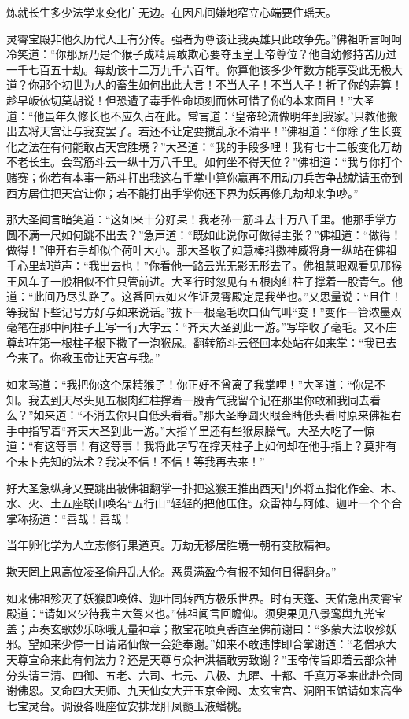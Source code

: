 \documentclass[12pt,UTF8]{ctexbook}
\begin{document}
{炼就长生多少法学来变化广无边。在因凡间嫌地窄立心端要住瑶天。

灵霄宝殿非他久历代人王有分传。强者为尊该让我英雄只此敢争先。”佛祖听言呵呵冷笑道：“你那厮乃是个猴子成精焉敢欺心要夺玉皇上帝尊位？他自幼修持苦历过一千七百五十劫。每劫该十二万九千六百年。你算他该多少年数方能享受此无极大道？你那个初世为人的畜生如何出此大言！不当人子！不当人子！折了你的寿算！趁早皈依切莫胡说！但恐遭了毒手性命顷刻而休可惜了你的本来面目！”大圣道：“他虽年久修长也不应久占在此。常言道：‘皇帝轮流做明年到我家。’只教他搬出去将天宫让与我变罢了。若还不让定要搅乱永不清平！”佛祖道：“你除了生长变化之法在有何能敢占天宫胜境？”大圣道：“我的手段多哩！我有七十二般变化万劫不老长生。会驾筋斗云一纵十万八千里。如何坐不得天位？”佛祖道：“我与你打个赌赛；你若有本事一筋斗打出我这右手掌中算你赢再不用动刀兵苦争战就请玉帝到西方居住把天宫让你；若不能打出手掌你还下界为妖再修几劫却来争吵。”

那大圣闻言暗笑道：“这如来十分好呆！我老孙一筋斗去十万八千里。他那手掌方圆不满一尺如何跳不出去？”急声道：“既如此说你可做得主张？”佛祖道：“做得！做得！”伸开右手却似个荷叶大小。那大圣收了如意棒抖擞神威将身一纵站在佛祖手心里却道声：“我出去也！”你看他一路云光无影无形去了。佛祖慧眼观看见那猴王风车子一般相似不住只管前进。大圣行时忽见有五根肉红柱子撑着一股青气。他道：“此间乃尽头路了。这番回去如来作证灵霄殿定是我坐也。”又思量说：“且住！等我留下些记号方好与如来说话。”拔下一根毫毛吹口仙气叫“变！”变作一管浓墨双毫笔在那中间柱子上写一行大字云：“齐天大圣到此一游。”写毕收了毫毛。又不庄尊却在第一根柱子根下撒了一泡猴尿。翻转筋斗云径回本处站在如来掌：“我已去今来了。你教玉帝让天宫与我。”

如来骂道：“我把你这个尿精猴子！你正好不曾离了我掌哩！”大圣道：“你是不知。我去到天尽头见五根肉红柱撑着一股青气我留个记在那里你敢和我同去看么？”如来道：“不消去你只自低头看看。”那大圣睁圆火眼金睛低头看时原来佛祖右手中指写着“齐天大圣到此一游。”大指丫里还有些猴尿臊气。大圣大吃了一惊道：“有这等事！有这等事！我将此字写在撑天柱子上如何却在他手指上？莫非有个未卜先知的法术？我决不信！不信！等我再去来！”

好大圣急纵身又要跳出被佛祖翻掌一扑把这猴王推出西天门外将五指化作金、木、水、火、土五座联山唤名“五行山”轻轻的把他压住。众雷神与阿傩、迦叶一个个合掌称扬道：“善哉！善哉！

当年卵化学为人立志修行果道真。万劫无移居胜境一朝有变散精神。

欺天罔上思高位凌圣偷丹乱大伦。恶贯满盈今有报不知何日得翻身。”

如来佛祖殄灭了妖猴即唤傩、迦叶同转西方极乐世界。时有天蓬、天佑急出灵霄宝殿道：“请如来少待我主大驾来也。”佛祖闻言回瞻仰。须臾果见八景鸾舆九光宝盖；声奏玄歌妙乐咏哦无量神章；散宝花喷真香直至佛前谢曰：“多蒙大法收殄妖邪。望如来少停一日请诸仙做一会筵奉谢。”如来不敢违悖即合掌谢道：“老僧承大天尊宣命来此有何法力？还是天尊与众神洪福敢劳致谢？”玉帝传旨即着云部众神分头请三清、四御、五老、六司、七元、八极、九曜、十都、千真万圣来此赴会同谢佛恩。又命四大天师、九天仙女大开玉京金阙、太玄宝宫、洞阳玉馆请如来高坐七宝灵台。调设各班座位安排龙肝凤髓玉液蟠桃。

}
\end{document}
